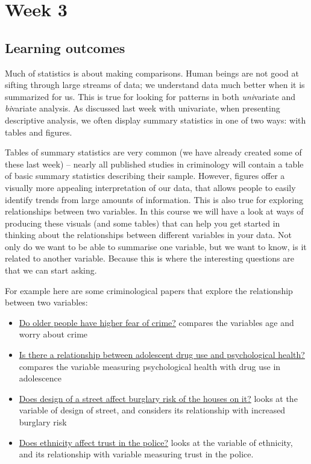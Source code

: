 \documentclass[
]{book}
\providecommand{\tightlist}{%
  \setlength{\itemsep}{0pt}\setlength{\parskip}{0pt}}
\begin{document}
\hypertarget{week3}{%
\chapter{Week 3}\label{week3}}

\hypertarget{learning-outcomes-2}{%
\section{Learning outcomes}\label{learning-outcomes-2}}

Much of statistics is about making comparisons. Human beings are not good at sifting through large streams of data; we understand data much better when it is summarized for us. This is true for looking for patterns in both \emph{uni}variate and \emph{bi}variate analysis. As discussed last week with univariate, when presenting descriptive analysis, we often display summary statistics in one of two ways: with tables and figures.

Tables of summary statistics are very common (we have already created some of these last week) -- nearly all published studies in criminology will contain a table of basic summary statistics describing their sample. However, figures offer a visually more appealing interpretation of our data, that allows people to easily identify trends from large amounts of information. This is also true for exploring relationships between two variables. In this course we will have a look at ways of producing these visuals (and some tables) that can help you get started in thinking about the relationships between different variables in your data. Not only do we want to be able to summarise one variable, but we want to know, is it related to another variable. Because this is where the interesting questions are that we can start asking.

For example here are some criminological papers that explore the relationship between two variables:

\begin{itemize}
\tightlist
\item
  \href{http://onlinelibrary.wiley.com/doi/10.1111/j.1745-9125.1989.tb01051.x/full}{Do older people have higher fear of crime?} compares the variables age and worry about crime
\item
  \href{http://psycnet.apa.org/record/1990-22928-001}{Is there a relationship between adolescent drug use and psychological health?} compares the variable measuring psychological health with drug use in adolescence
\item
  \href{https://link.springer.com/article/10.1007/s10940-009-9084-8}{Does design of a street affect burglary risk of the houses on it?} looks at the variable of design of street, and considers its relationship with increased burglary risk
\item
  \href{http://journals.sagepub.com/doi/abs/10.1177/1098611104271105}{Does ethnicity affect trust in the police?} looks at the variable of ethnicity, and its relationship with variable measuring trust in the police.
\end{itemize}
\end{document}
